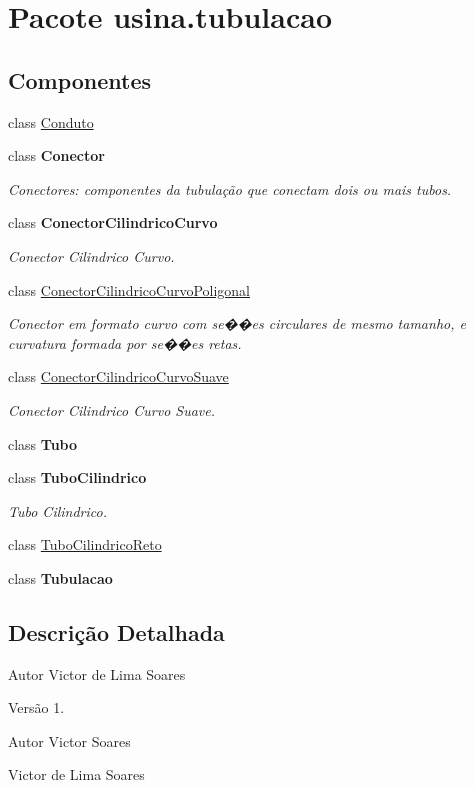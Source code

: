 \hypertarget{namespaceusina_1_1tubulacao}{\section{Pacote usina.\-tubulacao}
\label{namespaceusina_1_1tubulacao}
}
\subsection*{Componentes}
\begin{DoxyCompactItemize}
\item 
class \hyperlink{classusina_1_1tubulacao_1_1_conduto}{Conduto}
\item 
class {\bfseries Conector}
\begin{DoxyCompactList}\small\item\em Conectores\-: componentes da tubulação que conectam dois ou mais tubos. \end{DoxyCompactList}\item 
class {\bfseries Conector\-Cilindrico\-Curvo}
\begin{DoxyCompactList}\small\item\em Conector Cilindrico Curvo. \end{DoxyCompactList}\item 
class \hyperlink{classusina_1_1tubulacao_1_1_conector_cilindrico_curvo_poligonal}{Conector\-Cilindrico\-Curvo\-Poligonal}
\begin{DoxyCompactList}\small\item\em {\ttfamily Conector} em formato curvo com se��es circulares de mesmo tamanho, e curvatura formada por se��es retas. \end{DoxyCompactList}\item 
class \hyperlink{classusina_1_1tubulacao_1_1_conector_cilindrico_curvo_suave}{Conector\-Cilindrico\-Curvo\-Suave}
\begin{DoxyCompactList}\small\item\em Conector Cilindrico Curvo Suave. \end{DoxyCompactList}\item 
class {\bfseries Tubo}
\item 
class {\bfseries Tubo\-Cilindrico}
\begin{DoxyCompactList}\small\item\em Tubo Cilindrico. \end{DoxyCompactList}\item 
class \hyperlink{classusina_1_1tubulacao_1_1_tubo_cilindrico_reto}{Tubo\-Cilindrico\-Reto}
\item 
class {\bfseries Tubulacao}
\end{DoxyCompactItemize}


\subsection{Descrição Detalhada}
\begin{DoxyAuthor}{Autor}
Victor de Lima Soares 
\end{DoxyAuthor}
\begin{DoxyVersion}{Versão}
1.
\end{DoxyVersion}
\begin{DoxyAuthor}{Autor}
Victor Soares

Victor de Lima Soares 
\end{DoxyAuthor}
